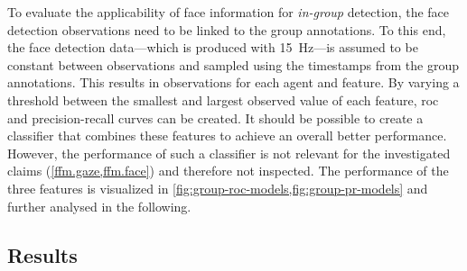 To evaluate the applicability of face information for \emph{in-group} detection, the face detection observations need to be linked to the group annotations.
To this end, the face detection data---which is produced with \SI{15}{Hz}---is assumed to be constant between observations and sampled using the timestamps from the group annotations.
This results in  observations for each agent and feature.
By varying a threshold between the smallest and largest observed value of each feature, \gls{roc} and \gls{precision}-\gls{recall} curves can be created.
It should be possible to create a classifier that combines these features to achieve an overall better performance.
However, the performance of such a classifier is not relevant for the investigated claims (\cref{ffm.gaze,ffm.face}) and therefore not inspected.
The performance of the three features is visualized in \cref{fig:group-roc-models,fig:group-pr-models} and further analysed in the following.

\subsection{Results}

